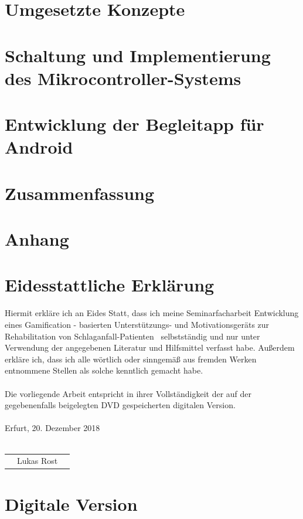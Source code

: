 \documentclass[a4paper, 11pt, titlepage, bibliography=totocnumbered]{scrartcl}
\begin{document}
\newpage
\section{Umgesetzte Konzepte}


\newpage
\section{Schaltung und Implementierung des Mikrocontroller-Systems}


\newpage
\section{Entwicklung der Begleitapp für Android}


\newpage
\section{Zusammenfassung}


\newpage


\newpage
\section{Anhang}


\newpage
\section*{Eidesstattliche Erklärung}
Hiermit erkläre ich an Eides Statt, dass ich meine Seminarfacharbeit \glqq Entwicklung eines Gamification - basierten Unterstützungs- und Motivationsgeräts zur Rehabilitation von Schlaganfall-Patienten\grqq ~ selbstständig und nur unter Verwendung der angegebenen Literatur und Hilfsmittel verfasst habe. Außerdem erkläre ich, dass ich alle wörtlich oder sinngemäß aus fremden Werken entnommene Stellen als solche kenntlich gemacht habe.\\ \\
Die vorliegende Arbeit entspricht in ihrer Vollständigkeit der auf der gegebenenfalls beigelegten DVD gespeicherten digitalen Version.
\\ \\
Erfurt, 20. Dezember 2018
\\ \\
\begin{center}
\begin{tabular}{@{}l@{}}\hline
$\: \: \:$ Lukas Rost $\: \: \:$
\end{tabular}
\end{center}

\newpage
\section*{Digitale Version}
\vspace{2cm}
\hspace{0.5cm}
\end{document}
